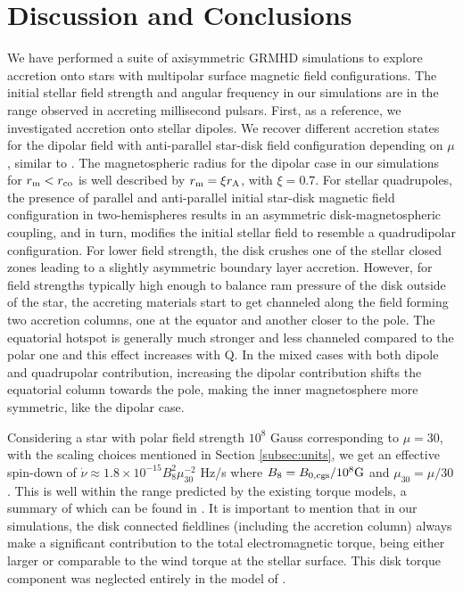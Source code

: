 \documentclass[fleqn,usenatbib]{mnras}
\begin{document}
\section{Discussion and Conclusions}\label{sec:discussion}

We have performed a suite of axisymmetric GRMHD simulations to explore accretion onto stars with multipolar surface magnetic field configurations. The initial stellar field strength and angular frequency in our simulations are in the range observed in accreting millisecond pulsars. First, as a reference, we investigated accretion onto stellar dipoles. We recover different accretion states for the dipolar field with anti-parallel star-disk field configuration depending on $\mu$, similar to  . The magnetospheric radius for the dipolar case in our simulations for $r_{\rm m} < r_{\rm co}$ is well described by $r_{\rm m} = \xi r_{\rm A}$, with $\xi = 0.7$. For stellar quadrupoles, the presence of parallel and anti-parallel initial star-disk magnetic field configuration in two-hemispheres results in an asymmetric disk-magnetospheric coupling, and in turn, modifies the initial stellar field to resemble a quadrudipolar configuration. For lower field strength, the disk crushes one of the stellar closed zones leading to a slightly asymmetric boundary layer accretion. However, for field strengths typically high enough to balance ram pressure of the disk outside of the star, the accreting materials start to get channeled along the field forming two accretion columns, one at the equator and another closer to the pole. The equatorial hotspot is generally much stronger and less channeled compared to the polar one and this effect increases with Q. In the mixed cases with both dipole and quadrupolar contribution, increasing the dipolar contribution shifts the equatorial column towards the pole, making the inner magnetosphere more symmetric, like the dipolar case.  
              

Considering a star with polar field strength $10^8$ Gauss corresponding to $\mu = 30$, with the scaling choices mentioned in Section \ref{subsec:units}, we get an effective spin-down of $\dot{\nu} \approx 1.8 \times 10^{-15} B_{8}^2 \mu_{30}^{-2}$ Hz/s where $B_{8} = B_{\rm 0,cgs}/10^8\rm G$ and $\mu_{30} = \mu/30$. This is well within the range predicted by the existing torque models, a summary of which can be found in \cite{Parfrey2016}. It is important to mention that in our simulations, the disk connected fieldlines (including the accretion column) always make a significant contribution to the total electromagnetic torque, being either larger or comparable to the wind torque at the stellar surface.  This disk torque component was neglected entirely in the model of \cite{Parfrey2016}.
\end{document}
